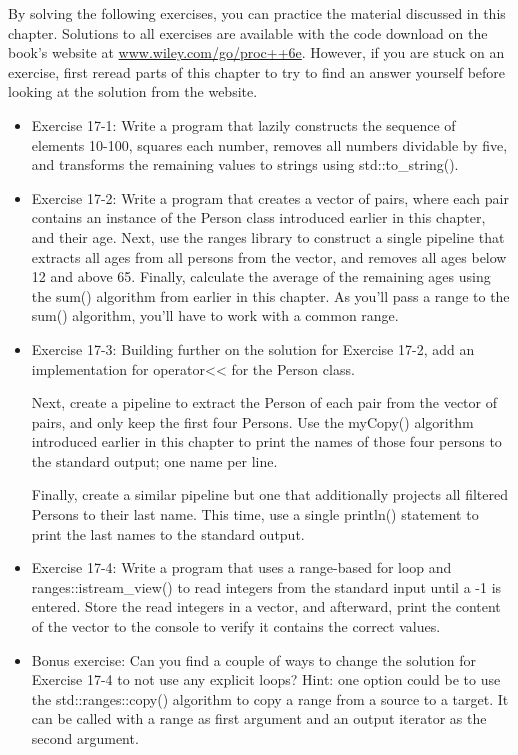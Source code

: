 By solving the following exercises, you can practice the material discussed in this chapter. Solutions to all exercises are available with the code download on the book’s website at \url{www.wiley.com/go/proc++6e}. However, if you are stuck on an exercise, first reread parts of this chapter to try to find an answer yourself before looking at the solution from the website.

\begin{itemize}
\item
Exercise 17-1: Write a program that lazily constructs the sequence of elements 10-100, squares each number, removes all numbers dividable by five, and transforms the remaining values to strings using std::to\_string().

\item
Exercise 17-2: Write a program that creates a vector of pairs, where each pair contains an instance of the Person class introduced earlier in this chapter, and their age. Next, use the ranges library to construct a single pipeline that extracts all ages from all persons from the vector, and removes all ages below 12 and above 65. Finally, calculate the average of the remaining ages using the sum() algorithm from earlier in this chapter. As you’ll pass a range to the sum() algorithm, you’ll have to work with a common range.

\item
Exercise 17-3: Building further on the solution for Exercise 17-2, add an implementation for operator<< for the Person class.

Next, create a pipeline to extract the Person of each pair from the vector of pairs, and only keep the first four Persons. Use the myCopy() algorithm introduced earlier in this chapter to print the names of those four persons to the standard output; one name per line.

Finally, create a similar pipeline but one that additionally projects all filtered Persons to their last name. This time, use a single println() statement to print the last names to the standard output.

\item
Exercise 17-4: Write a program that uses a range-based for loop and ranges::istream\_view() to read integers from the standard input until a -1 is entered. Store the read integers in a vector, and afterward, print the content of the vector to the console to verify it contains the correct values.

\item
Bonus exercise: Can you find a couple of ways to change the solution for Exercise 17-4 to not use any explicit loops? Hint: one option could be to use the std::ranges::copy() algorithm to copy a range from a source to a target. It can be called with a range as first argument and an output iterator as the second argument.
\end{itemize}




